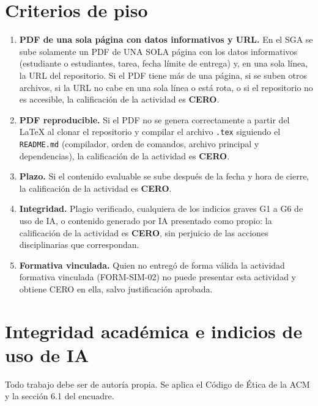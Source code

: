 \documentclass[11pt]{article}
\newcommand{\seccion}[1]{\section{\textcolor{utegreendk}{#1}}}
\begin{document}
\seccion{Criterios de piso}

\begin{cajapiso}[title={Criterios de piso: su incumplimiento implica calificación CERO en la actividad}]
	\begin{enumerate}[label=\textbf{P\arabic*.},leftmargin=24pt,itemsep=3pt]
		\item \textbf{PDF de una sola página con datos informativos y URL.} En el SGA se sube solamente un PDF de UNA SOLA página con los datos informativos (estudiante o estudiantes, tarea, fecha límite de entrega) y, en una sola línea, la URL del repositorio. Si el PDF tiene más de una página, si se suben otros archivos, si la URL no cabe en una sola línea o está rota, o si el repositorio no es accesible, la calificación de la actividad es \textbf{CERO}.
		\item \textbf{PDF reproducible.} Si el PDF no se genera correctamente a partir del \LaTeX{} al clonar el repositorio y compilar el archivo \texttt{.tex} siguiendo el \texttt{README.md} (compilador, orden de comandos, archivo principal y dependencias), la calificación de la actividad es \textbf{CERO}.
		\item \textbf{Plazo.} Si el contenido evaluable se sube después de la fecha y hora de cierre, la calificación de la actividad es \textbf{CERO}.
		\item \textbf{Integridad.} Plagio verificado, cualquiera de los indicios graves G1 a G6 de uso de IA, o contenido generado por IA presentado como propio: la calificación de la actividad es \textbf{CERO}, sin perjuicio de las acciones disciplinarias que correspondan.
		\item \textbf{Formativa vinculada.} Quien no entregó de forma válida la actividad formativa vinculada (FORM-SIM-02) no puede presentar esta actividad y obtiene CERO en ella, salvo justificación aprobada.
	\end{enumerate}
\end{cajapiso}

\seccion{Integridad académica e indicios de uso de IA}

Todo trabajo debe ser de autoría propia. Se aplica el Código de Ética de la ACM \citep{acm_code_2018} y la sección 6.1 del encuadre.
\end{document}
